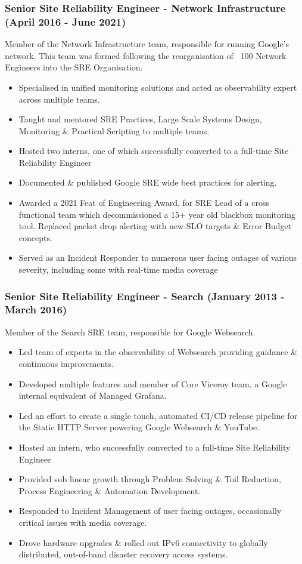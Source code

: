 \documentclass[a4paper, 10pt] {article}
\begin{document}
\subsubsection*{Senior Site Reliability Engineer - Network Infrastructure (April 2016 - June 2021)}

Member of the Network Infrastructure team, responsible for running
Google's network. This team was formed following the reorganisation of
~100 Network Engineers into the SRE Organisation.

\begin{itemize}[noitemsep]
	\item Specialised in unified monitoring solutions and acted as observability expert across multiple teams.
	\item Taught and mentored SRE Practices, Large Scale Systems Design, Monitoring \& Practical Scripting to multiple teams.
 	\item Hosted two interns, one of which successfully converted to a full-time Site Reliability Engineer
	\item Documented \& published Google SRE wide best practices for alerting.
	\item Awarded a 2021 Feat of Engineering Award, for SRE Lead of a cross functional team which decommissioned a 15+ year old blackbox
		monitoring tool. Replaced packet drop alerting with new SLO targets \& Error Budget concepts.
	\item Served as an Incident Responder to numerous user facing outages of various severity, including some with real-time media coverage
\end{itemize}

\subsubsection*{Senior Site Reliability Engineer - Search (January 2013 - March 2016)}

Member of the Search SRE team, responsible for Google Websearch.

\begin{itemize}[noitemsep]
	\item Led team of experts in the observability of Websearch providing guidance \& continuous improvements.
	\item Developed multiple features and member of Core Viceroy team, a Google internal equivalent of Managed Grafana.
  	\item Led an effort to create a single touch, automated CI/CD release pipeline for the Static HTTP Server powering Google Websearch \& YouTube.
   	\item Hosted an intern, who successfully converted to a full-time Site Reliability Engineer
	\item Provided sub linear growth through Problem Solving \& Toil Reduction, Process Engineering \& Automation Development.
	\item Responded to Incident Management of user facing outages, occasionally critical issues with media coverage.
 	\item Drove hardware upgrades \& rolled out IPv6 connectivity to globally distributed, out-of-band disaster recovery access systems.
\end{itemize}
\end{document}
